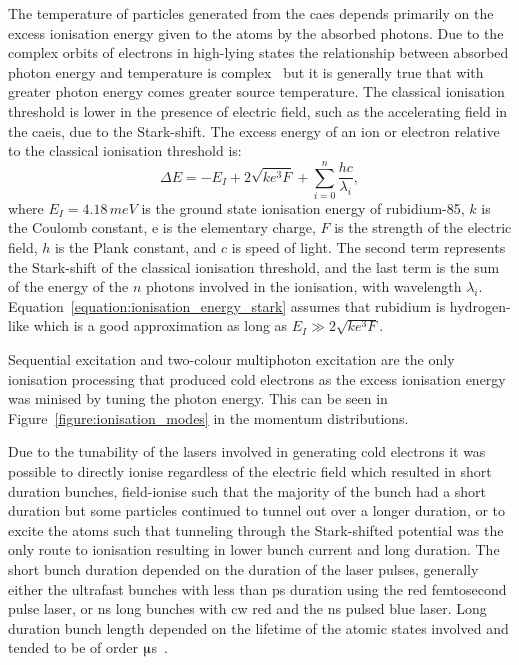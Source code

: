 The temperature of particles generated from the \gls{caes} depends primarily on the excess ionisation energy given to the atoms by the absorbed photons.
Due to the complex orbits of electrons in high-lying states the relationship between absorbed photon energy and temperature is complex~\cite{mcculloch_high-coherence_2013} but it is generally true that with greater photon energy comes greater source temperature.
The classical ionisation threshold is lower in the presence of electric field, such as the accelerating field in the \gls{caeis}, due to the Stark-shift.
The excess energy of an ion or electron relative to the classical ionisation threshold is:
\begin{equation}\label{equation:ionisation_energy_stark}
\Delta E = -E_I + 2\sqrt{ke^3F} + \sum_{i=0}^{n}{\frac{hc}{\lambda_i}},
\end{equation}
where $E_I=4.18\,meV$ is the ground state ionisation energy of rubidium-85, $k$ is the Coulomb constant, e is the elementary charge, $F$ is the strength of the electric field, $h$ is the Plank constant, and $c$ is speed of light.
The second term represents the Stark-shift of the classical ionisation threshold, and the last term is the sum of the energy of the $n$ photons involved in the ionisation, with wavelength $\lambda_i$.
Equation~\ref{equation:ionisation_energy_stark} assumes that rubidium is hydrogen-like which is a good approximation as long as $E_I \gg 2\sqrt{ke^3F}$.

Sequential excitation and two-colour multiphoton excitation are the only ionisation processing that produced cold electrons as the excess ionisation energy was minised by tuning the photon energy.
This can be seen in Figure~\ref{figure:ionisation_modes} in the momentum distributions.

Due to the tunability of the lasers involved in generating cold electrons it was possible to directly ionise regardless of the electric field which resulted in short duration bunches, field-ionise such that the majority of the bunch had a short duration but some particles continued to tunnel out over a longer duration, or to excite the atoms such that tunneling through the Stark-shifted potential was the only route to ionisation resulting in lower bunch current and long duration.
The short bunch duration depended on the duration of the laser pulses, generally either the ultrafast bunches with less than \unit[320]{ps} duration using the red femtosecond pulse laser, or \unit[5]{ns} long bunches with \gls{cw} red and the \unit[5]{ns} pulsed blue laser.
Long duration bunch length depended on the lifetime of the atomic states involved and tended to be of order \unit[10]{$\muup$s}~\cite{speirs_identification_2017}.

